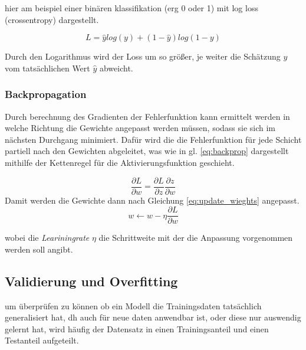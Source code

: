 hier am beispiel einer binären klassifikation (erg 0 oder 1) mit log loss
 (crossentropy) dargestellt.

 \begin{equation}
    \label{eq:crossentropy}
    L = \hat{y}log(y) + (1 - \hat{y})log(1 - y)
\end{equation}

Durch den Logarithmus wird der Loss um so größer, je weiter die Schätzung $y$ vom 
tatsächlichen Wert $\hat{y}$ abweicht.


\subsubsection{Backpropagation}
Durch berechnung des Gradienten der Fehlerfunktion kann ermittelt 
werden in welche Richtung die Gewichte angepasst werden müssen, sodass sie sich 
im nächsten Durchgang minimiert.
Dafür wird die die Fehlerfunktion für jede Schicht partiell nach den 
Gewichten abgeleitet, was wie in gl. \ref{eq:backprop} dargestellt mithilfe der 
Kettenregel für die Aktivierungsfunktion geschieht.


\begin{equation}
    \label{eq:backprop}
    \frac{\partial L}{\partial w} = \frac{\partial L}{\partial z}\frac{\partial z}{\partial w}
\end{equation}
Damit werden die Gewichte dann nach Gleichung \ref{eq:update_wieghts} angepasst.
\begin{equation}
    \label{eq:update_wieghts}
    w  \leftarrow w - \eta \frac{\partial L}{\partial w}
\end{equation}

wobei die \textit{Leariningrate} $\eta$ die Schrittweite mit der die Anpassung vorgenommen
werden soll angibt.








\subsection{Validierung und Overfitting}\label{subsec:validation}

um überprüfen zu können ob ein Modell die Trainingsdaten tatsächlich generalisiert 
hat, dh auch für neue daten anwendbar ist, oder diese nur auswendig gelernt hat, 
wird häufig der Datensatz in einen Trainingsanteil und einen Testanteil aufgeteilt.

